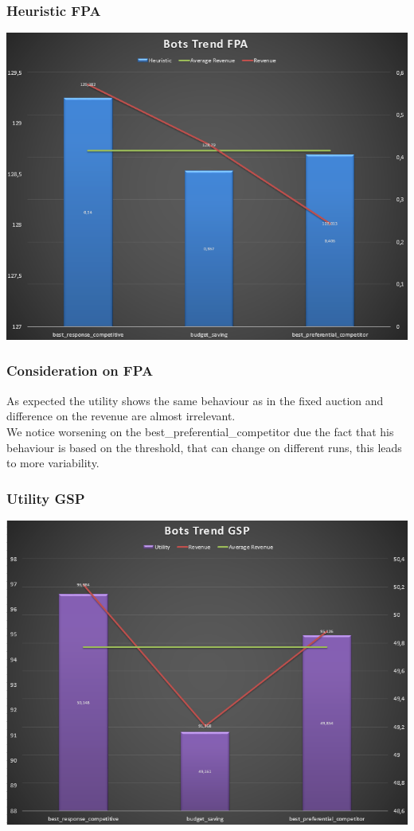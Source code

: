 \documentclass{beamer}
\begin{document}
\begin{frame}
\frametitle{Heuristic FPA}
\begin{center}
\includegraphics[scale=0.46]{img/Auctions/RFPA_all_Heuristic.PNG} 
\end{center}
\end{frame}

\begin{frame}
\frametitle{Consideration on FPA}
As expected the utility shows the \alert{same} behaviour as in the fixed auction and difference on the revenue are almost irrelevant.\\
\medskip
We notice \alert{worsening} on the best\_preferential\_competitor due the fact that his behaviour is based on the threshold, that can change on different runs, this leads to more variability. 
\end{frame}

\begin{frame}
\frametitle{Utility GSP}
\begin{center}
\includegraphics[scale=0.46]{img/Auctions/RGSP_all_Utility.PNG} 
\end{center}
\end{frame}
\end{document}
